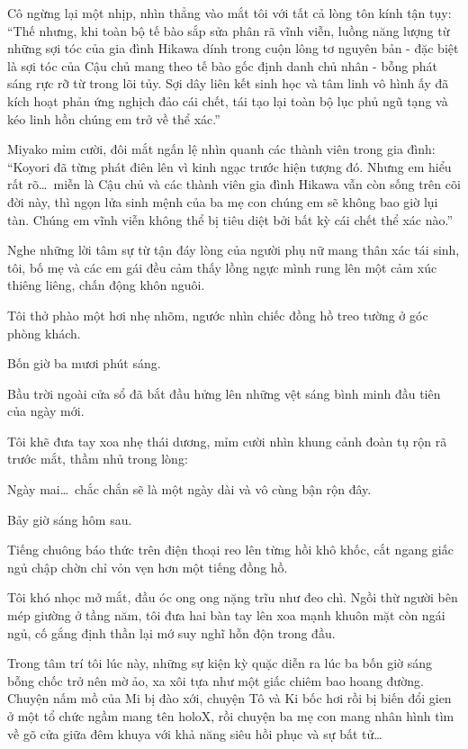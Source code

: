 \documentclass[../main.tex]{subfiles}
\begin{document}
Cô ngừng lại một nhịp, nhìn thẳng vào mắt tôi với tất cả lòng tôn kính tận tụy: ``Thế nhưng, khi toàn bộ tế bào sắp sửa phân rã vĩnh viễn, luồng năng lượng từ những sợi tóc của gia đình Hikawa dính trong cuộn lông tơ nguyên bản - đặc biệt là sợi tóc của Cậu chủ mang theo tế bào gốc định danh chủ nhân - bỗng phát sáng rực rỡ từ trong lõi tủy. Sợi dây liên kết sinh học và tâm linh vô hình ấy đã kích hoạt phản ứng nghịch đảo cái chết, tái tạo lại toàn bộ lục phủ ngũ tạng và kéo linh hồn chúng em trở về thể xác.''

Miyako mỉm cười, đôi mắt ngấn lệ nhìn quanh các thành viên trong gia đình: ``Koyori đã từng phát điên lên vì kinh ngạc trước hiện tượng đó. Nhưng em hiểu rất rõ\dots\ miễn là Cậu chủ và các thành viên gia đình Hikawa vẫn còn sống trên cõi đời này, thì ngọn lửa sinh mệnh của ba mẹ con chúng em sẽ không bao giờ lụi tàn. Chúng em vĩnh viễn không thể bị tiêu diệt bởi bất kỳ cái chết thể xác nào.''

Nghe những lời tâm sự từ tận đáy lòng của người phụ nữ mang thân xác tái sinh, tôi, bố mẹ và các em gái đều cảm thấy lồng ngực mình rung lên một cảm xúc thiêng liêng, chấn động khôn nguôi.

Tôi thở phào một hơi nhẹ nhõm, ngước nhìn chiếc đồng hồ treo tường ở góc phòng khách.

Bốn giờ ba mươi phút sáng.

Bầu trời ngoài cửa sổ đã bắt đầu hửng lên những vệt sáng bình minh đầu tiên của ngày mới.

Tôi khẽ đưa tay xoa nhẹ thái dương, mỉm cười nhìn khung cảnh đoàn tụ rộn rã trước mắt, thầm nhủ trong lòng:

Ngày mai\dots\ chắc chắn sẽ là một ngày dài và vô cùng bận rộn đây.

\omk

Bảy giờ sáng hôm sau.

Tiếng chuông báo thức trên điện thoại reo lên từng hồi khô khốc, cắt ngang giấc ngủ chập chờn chỉ vỏn vẹn hơn một tiếng đồng hồ.

Tôi khó nhọc mở mắt, đầu óc ong ong nặng trĩu như đeo chì. Ngồi thừ người bên mép giường ở tầng năm, tôi đưa hai bàn tay lên xoa mạnh khuôn mặt còn ngái ngủ, cố gắng định thần lại mớ suy nghĩ hỗn độn trong đầu.

Trong tâm trí tôi lúc này, những sự kiện kỳ quặc diễn ra lúc ba bốn giờ sáng bỗng chốc trở nên mờ ảo, xa xôi tựa như một giấc chiêm bao hoang đường. Chuyện nấm mồ của Mi bị đào xới, chuyện Tô và Ki bốc hơi rồi bị biến đổi gien ở một tổ chức ngầm mang tên holoX, rồi chuyện ba mẹ con mang nhân hình tìm về gõ cửa giữa đêm khuya với khả năng siêu hồi phục và sự bất tử\dots
\end{document}
